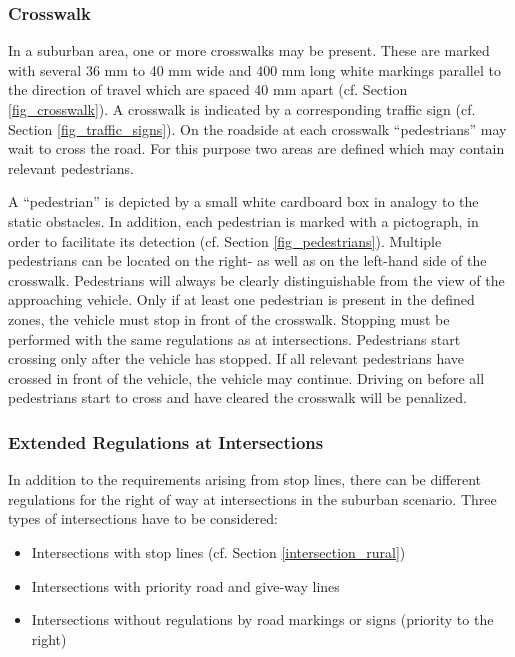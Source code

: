 \documentclass[a4paper]{report}
\begin{document}
\subsubsection{Crosswalk}

In a suburban area, one or more crosswalks may be present. These are marked
with several 36 mm to 40 mm wide and 400 mm long white markings parallel to the
direction of travel which are spaced 40 mm apart (cf. Section
\ref{fig_crosswalk}). A crosswalk is indicated by a corresponding traffic sign
(cf. Section \ref{fig_traffic_signs}). On the roadside at each crosswalk
“pedestrians” may wait to cross the road. For this purpose two areas are
defined which may contain relevant pedestrians.

A “pedestrian” is depicted by a small white cardboard box in analogy to the
static obstacles. In addition, each pedestrian is marked with a pictograph, in
order to facilitate its detection (cf. Section \ref{fig_pedestrians}). Multiple
pedestrians can be located on the right- as well as on the left-hand side of
the crosswalk. Pedestrians will always be clearly distinguishable from the view
of the approaching vehicle. Only if at least one pedestrian is present in the
defined zones, the vehicle must stop in front of the crosswalk. Stopping must
be performed with the same regulations as at intersections. Pedestrians start
crossing only after the vehicle has stopped. If all relevant pedestrians have
crossed in front of the vehicle, the vehicle may continue. Driving on before
all pedestrians start to cross and have cleared the crosswalk will be
penalized.

\subsubsection{Extended Regulations at Intersections}

In addition to the requirements arising from stop lines, there can be different
regulations for the right of way at intersections in the suburban scenario.
Three types of intersections have to be considered:

\begin{itemize}
	\item Intersections with stop lines (cf. Section \ref{intersection_rural})
	\item Intersections with priority road and give-way lines
	\item Intersections without regulations by road markings or signs (priority to the
	      right)
\end{itemize}
\end{document}
